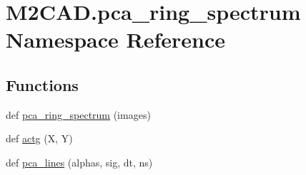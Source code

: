 \hypertarget{namespace_m2_c_a_d_1_1pca__ring__spectrum}{}\section{M2\+C\+A\+D.\+pca\+\_\+ring\+\_\+spectrum Namespace Reference}
\label{namespace_m2_c_a_d_1_1pca__ring__spectrum}
\subsection*{Functions}
\begin{DoxyCompactItemize}
\item 
def \hyperlink{namespace_m2_c_a_d_1_1pca__ring__spectrum_a25a564be4dcce1a5bd11bfe0e9a845bd}{pca\+\_\+ring\+\_\+spectrum} (images)
\item 
def \hyperlink{namespace_m2_c_a_d_1_1pca__ring__spectrum_ae8afef014a141f6cca1235ba3ce9d68f}{actg} (X, Y)
\item 
def \hyperlink{namespace_m2_c_a_d_1_1pca__ring__spectrum_a479084a8b61b9a6467679eaef5c28791}{pca\+\_\+lines} (alphas, sig, dt, ns)
\end{DoxyCompactItemize}
